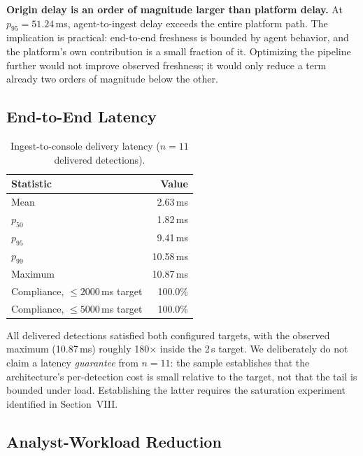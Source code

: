 \documentclass[conference]{IEEEtran}
\begin{document}
\noindent \textbf{Origin delay is an order of magnitude larger than platform
delay.} At $p_{95}{=}51.24$\,ms, agent-to-ingest delay exceeds the entire
platform path. The implication is practical: end-to-end freshness is bounded
by agent behavior, and the platform's own contribution is a small fraction of
it. Optimizing the pipeline further would not improve observed freshness; it
would only reduce a term already two orders of magnitude below the other.

\subsection{End-to-End Latency}

\begin{table}[t]
\caption{Ingest-to-console delivery latency ($n=11$ delivered detections).}
\label{tab:e2e}
\centering
\small
\begin{tabular}{@{}lr@{}}
\toprule
\textbf{Statistic} & \textbf{Value} \\
\midrule
Mean & 2.63\,ms \\
$p_{50}$ & 1.82\,ms \\
$p_{95}$ & 9.41\,ms \\
$p_{99}$ & 10.58\,ms \\
Maximum & 10.87\,ms \\
Compliance, $\leq 2000$\,ms target & 100.0\% \\
Compliance, $\leq 5000$\,ms target & 100.0\% \\
\bottomrule
\end{tabular}
\end{table}

All delivered detections satisfied both configured targets, with the
observed maximum (10.87\,ms) roughly 180$\times$ inside the 2\,s target. We
deliberately do not claim a latency \emph{guarantee} from $n=11$: the sample
establishes that the architecture's per-detection cost is small relative to
the target, not that the tail is bounded under load. Establishing the latter
requires the saturation experiment identified in Section~VIII.

\subsection{Analyst-Workload Reduction}
\end{document}
